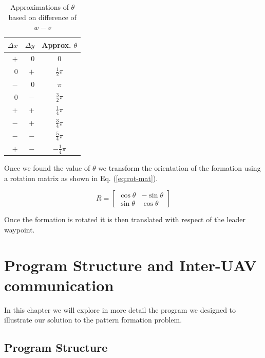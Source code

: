 \begin{table}
	\caption{Approximations of $\theta$ based on difference of $w - v$}\label{tab:approx}
	\begin{center}
		\begin{tabular}[c]{r|r|c}
			\hline
			\multicolumn{1}{c|}{\textbf{$\Delta x$}} & 
			\multicolumn{1}{c|}{\textbf{$\Delta y$}} &
			\multicolumn{1}{c}{Approx. \textbf{$\theta$}} \\
			\hline
			\hline
			$+$ & $0$ & $0$ \\
			\hline
			$0$ & $+$ & $\frac{1}{2}\pi$ \\
			\hline
			$-$ & $0$ & $\pi$ \\
			\hline
			$0$ & $-$ & $\frac{3}{2}\pi$ \\
			\hline
			$+$ & $+$ & $\frac{1}{4}\pi$ \\
			\hline
			$-$ & $+$ & $\frac{3}{4}\pi$ \\
			\hline
			$-$ & $-$ & $\frac{5}{4}\pi$ \\
			\hline
			$+$ & $-$ & $-\frac{1}{4}\pi$ \\
			\hline
		\end{tabular}
	\end{center}
\end{table}

Once we found the value of $\theta$ we transform the orientation of the formation using a rotation matrix
as shown in Eq. (\ref{eq:rot-mat}).

\begin{equation}
	R = \begin{bmatrix} \cos \theta & -\sin \theta \\ \sin \theta & \cos \theta \end{bmatrix}
	\label{eq:rot-mat}
\end{equation}

Once the formation is rotated it is then translated with respect of the leader waypoint.


\chapter{Program Structure and Inter-UAV communication}

In this chapter we will explore in more detail the program we designed to illustrate our 
solution to the pattern formation problem.

\section{Program Structure}

